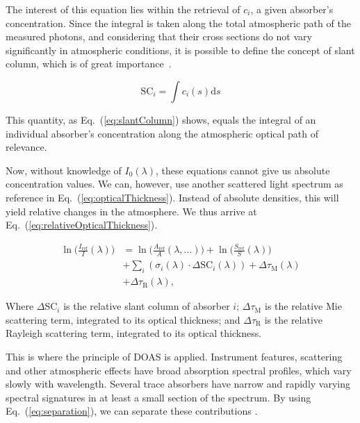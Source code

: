 The interest of this equation lies within the retrieval of $c_i$, a
given absorber's concentration. Since the integral is taken along the
total atmospheric path of the measured photons, and considering that
their cross sections do not vary significantly in atmospheric
conditions, it is possible to define the concept of slant column, which
is of great importance~\cite{Merlaud2013}.

\begin{equation}
      \label{eq:slantColumn}
      \mathrm{SC}_{i} = \int c_{i}(s)\mathrm{d}s
\end{equation}

This quantity, as Eq.~(\ref{eq:slantColumn}) shows, equals the integral
of an individual absorber's concentration along the atmospheric optical
path of relevance.

Now, without knowledge of $I_{0}(\lambda)$, these equations cannot give
us absolute concentration values. We can, however, use another scattered
light spectrum as reference in Eq.~(\ref{eq:opticalThickness}). Instead
of absolute densities, this will yield relative changes in the
atmosphere. We thus arrive at Eq.~(\ref{eq:relativeOpticalThickness}).

\begin{align}
      \label{eq:relativeOpticalThickness}
      \ln\Big( \frac{I_\mathrm{ref}}{I}(\lambda) \Big) &= \ln\Big( \frac{A_\mathrm{ref}}{A}(\lambda,\ldots) \Big) + \ln\Big( \frac{S_\mathrm{ref}}{S}(\lambda) \Big) \nonumber\\
      &+  \sum_{i} (\sigma_{i}(\lambda) \cdot \Delta \mathrm{SC}_{i}(\lambda)) + \Delta \tau_\mathrm{M}(\lambda) \nonumber\\
      &+ \Delta \tau_\mathrm{R}(\lambda),
\end{align}

Where $\Delta \mathrm{SC}_{i}$  is the relative slant column of absorber
$i$; $\Delta \tau_\mathrm{M}$  is the relative Mie scattering term,
integrated to its optical thickness; and $\Delta \tau_\mathrm{R}$ is the
relative Rayleigh scattering term, integrated to its optical thickness.


This is where the principle of DOAS is applied. Instrument features,
scattering and other atmospheric effects have broad absorption spectral
profiles, which vary slowly with wavelength. Several trace absorbers
have narrow and rapidly varying spectral signatures in at least a small
section of the spectrum. By using Eq.~(\ref{eq:separation}), we can
separate these contributions \cite{Danckaert2015}.

